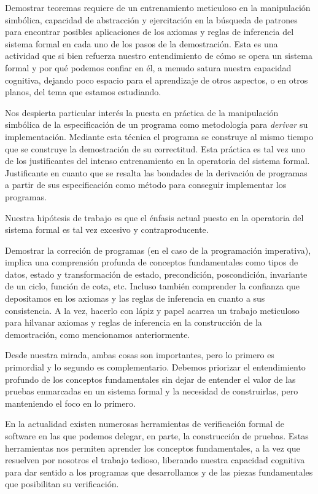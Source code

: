 \documentclass[12pt, a4paper, openany, fleqn]{book}
\begin{document}
    Demostrar teoremas requiere de un entrenamiento meticuloso en la manipulación simbólica, capacidad de abstracción y ejercitación en la búsqueda de patrones para encontrar posibles aplicaciones de los axiomas y reglas de inferencia del sistema formal en cada uno de los pasos de la demostración.
    Esta es una actividad que si bien refuerza nuestro entendimiento de cómo se opera un sistema formal y por qué podemos confiar en él, a menudo satura nuestra capacidad cognitiva, dejando poco espacio para el aprendizaje de otros aspectos, o en otros planos, del tema que estamos estudiando.

    Nos despierta particular interés la puesta en práctica de la manipulación simbólica de la especificación de un programa como metodología para \textit{derivar} su implementación. Mediante esta técnica el programa se construye al mismo tiempo que se construye la demostración de su correctitud.
    Esta práctica es tal vez uno de los justificantes del intenso entrenamiento en la operatoria del sistema formal. Justificante en cuanto que se resalta las bondades de la derivación de programas a partir de sus especificación como método para conseguir implementar los programas.

    Nuestra hipótesis de trabajo es que el énfasis actual puesto en la operatoria del sistema formal es tal vez excesivo y contraproducente.

    Demostrar la correción de programas (en el caso de la programación imperativa), implica una comprensión profunda de conceptos fundamentales como tipos de datos, estado y transformación de estado, precondición, poscondición, invariante de un ciclo, función de cota, etc. Incluso también comprender la confianza que depositamos en los axiomas y las reglas de inferencia en cuanto a sus consistencia.
    A la vez, hacerlo con lápiz y papel acarrea un trabajo meticuloso para hilvanar axiomas y reglas de inferencia en la construcción de la demostración, como mencionamos anteriormente.

    Desde nuestra mirada, ambas cosas son importantes, pero lo primero es primordial y lo segundo es complementario. Debemos priorizar el entendimiento profundo de los conceptos fundamentales sin dejar de entender el valor de las pruebas enmarcadas en un sistema formal y la necesidad de construirlas, pero manteniendo el foco en lo primero.

    En la actualidad existen numerosas herramientas de verificación formal de software en las que podemos delegar, en parte, la construcción de pruebas. Estas herramientas nos permiten aprender los conceptos fundamentales, a la vez que resuelven por nosotros el trabajo tedioso, liberando nuestra capacidad cognitiva para dar sentido a los programas que desarrollamos y de las piezas fundamentales que posibilitan su verificación.
\end{document}
